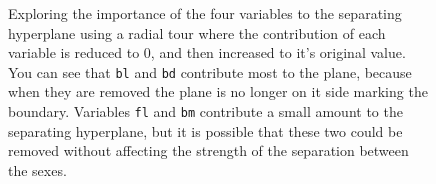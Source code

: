 \documentclass[
  letterpaper,
]{book}
\newenvironment{Shaded}{\begin{snugshade}}{\end{snugshade}}
\newcommand{\AttributeTok}[1]{\textcolor[rgb]{0.40,0.45,0.13}{#1}}
\newcommand{\DecValTok}[1]{\textcolor[rgb]{0.68,0.00,0.00}{#1}}
\newcommand{\FunctionTok}[1]{\textcolor[rgb]{0.28,0.35,0.67}{#1}}
\newcommand{\NormalTok}[1]{\textcolor[rgb]{0.00,0.23,0.31}{#1}}
\newcommand{\SpecialCharTok}[1]{\textcolor[rgb]{0.37,0.37,0.37}{#1}}
\newcommand{\StringTok}[1]{\textcolor[rgb]{0.13,0.47,0.30}{#1}}
\begin{document}
\begin{Shaded}
\end{Shaded}

\begin{figure}

\begin{minipage}[t]{0.50\linewidth}

{\centering 

}

\end{minipage}%

\caption{\label{fig-chinstrap-radial}Exploring the importance of the
four variables to the separating hyperplane using a radial tour where
the contribution of each variable is reduced to 0, and then increased to
it's original value. You can see that \texttt{bl} and \texttt{bd}
contribute most to the plane, because when they are removed the plane is
no longer on it side marking the boundary. Variables \texttt{fl} and
\texttt{bm} contribute a small amount to the separating hyperplane, but
it is possible that these two could be removed without affecting the
strength of the separation between the sexes.}

\end{figure}
\end{document}
